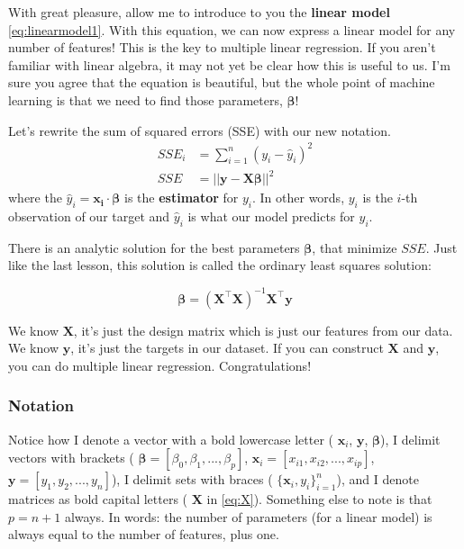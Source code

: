 \noindent With great pleasure, allow me to introduce to you the \textbf{linear model} \autoref{eq:linearmodel1}. With this equation, we can now express a linear model for any number of features! This is the key to multiple linear regression. If you aren't familiar with linear algebra, it may not yet be clear how this is useful to us. I'm sure you agree that the equation is beautiful, but the whole point of machine learning is that we need to find those parameters, $\boldsymbol{\beta}$!

Let's rewrite the sum of squared errors (SSE) with our new notation.
\begin{align*}
    SSE_i &= \sum_{i=1}^n (y_i - \hat{y}_i)^2 \\
    SSE &= ||\mathbf{y}-\mathbf{X}\boldsymbol{\beta}||^2
\end{align*}
\noindent where the $\hat{y}_i=\mathbf{x_i}\cdot\boldsymbol{\beta}$ is the \textbf{estimator} for $y_i$. In other words, $y_i$ is the $i$-th observation of our target and $\hat{y}_i$ is what our model predicts for $y_i$.

There is an analytic solution for the best parameters $\boldsymbol{\beta}$, that minimize $SSE$. Just like the last lesson, this solution is called the ordinary least squares solution:

\begin{equation}\label{eq:ols}
    \boldsymbol{\beta} = (\mathbf{X}^\intercal \mathbf{X})^{-1} \mathbf{X}^\intercal \mathbf{y}
\end{equation}

\noindent We know $\mathbf{X}$, it's just the design matrix which is just our features from our data. We know $\mathbf{y}$, it's just the targets in our dataset. If you can construct $\mathbf{X}$ and $\mathbf{y}$, you can do multiple linear regression. Congratulations!

\subsubsection*{Notation}
Notice how I denote a vector with a bold lowercase letter (\eg{} $\mathbf{x}_i$, $\mathbf{y}$, $\boldsymbol{\beta}$), I delimit vectors with brackets (\eg{} $\boldsymbol{\beta}=[\beta_0,\beta_1,...,\beta_p]$, $\mathbf{x}_i=[x_{i1},x_{i2},...,x_{ip}]$, $\mathbf{y}=[y_1,y_2,...,y_n]$), I delimit sets with braces (\eg{} $\{\mathbf{x}_i,y_i\}_{i=1}^n$), and I denote matrices as bold capital letters (\eg{} $\mathbf{X}$ in \autoref{eq:X}). Something else to note is that $p=n+1$ always. In words: the number of parameters (for a linear model) is always equal to the number of features, plus one.

